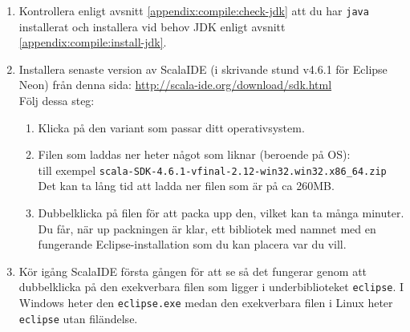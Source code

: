 \begin{enumerate}
\item Kontrollera enligt avsnitt \ref{appendix:compile:check-jdk} att du har \texttt{java} installerat och installera vid behov JDK enligt avsnitt \ref{appendix:compile:install-jdk}.

\item Installera senaste version av ScalaIDE (i skrivande stund v4.6.1 för Eclipse Neon) från denna sida:  \url{http://scala-ide.org/download/sdk.html} \\
Följ dessa steg:
\begin{enumerate}
\item Klicka på den variant som passar ditt operativsystem.
\item Filen som laddas ner heter något som liknar (beroende på OS): \\ till exempel  \texttt{scala-SDK-4.6.1-vfinal-2.12-win32.win32.x86\_64.zip}
\\ Det kan ta lång tid att ladda ner filen som är på ca 260MB.

\item Dubbelklicka på filen för att packa upp den, vilket kan ta många minuter. Du får, när up	packningen är klar, ett bibliotek med namnet  med en fungerande Eclipse-installation som du kan placera var du vill.
\end{enumerate}

\item Kör igång ScalaIDE första gången för att se så det fungerar genom att dubbelklicka på den exekverbara filen som ligger i underbiblioteket \texttt{eclipse}. I Windows heter den \texttt{eclipse.exe} medan den exekverbara filen i Linux heter \texttt{eclipse} utan filändelse.


\end{enumerate}
